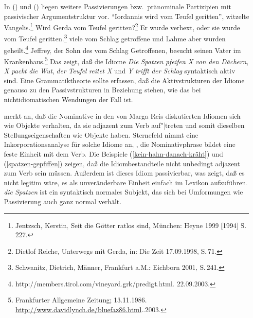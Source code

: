 \noindent
In () und () liegen weitere Passivierungen bzw.\ pränominale Partizipien mit passivischer
Argumentstruktur vor.
\eal
\label{vom-teufel-geritten}
\ex 
"`Iordannis wird vom Teufel geritten"', witzelte Vangelis.\footnote{
Jentzsch, Kerstin, Seit die Götter ratlos sind, München: Heyne 1999 [1994] S.\,227.
}
\ex Wird Gerda vom Teufel geritten?\footnote{
Dietlof Reiche, Unterwegs mit Gerda, in: Die Zeit 17.09.1998, S.\,71.
}
\ex
Er wurde verhext, oder sie wurde vom Teufel geritten.\footnote{
Schwanitz, Dietrich, Männer, Frankfurt a.M.: Eichborn 2001, S.\,241.
}
\zl
\eal
\ex viele vom Schlag getroffene und Lahme aber wurden geheilt.\footnote{
        http://members.tirol.com/vineyard.grk/predigt.html. 22.09.2003.
}
\ex Jeffrey, der Sohn des vom Schlag Getroffenen, besucht seinen Vater im Krankenhaus.\footnote{
         Frankfurter Allgemeine Zeitung; 13.11.1986. \url{http://www.davidlynch.de/bluefaz86.html}..2003.%
}
\zl
Das zeigt, daß die Idiome \emph{Die Spatzen pfeifen X von den Dächern}, \emph{X packt die Wut},
\emph{der Teufel reitet X} und \emph{Y trifft der Schlag} syntaktisch aktiv sind. Eine Grammatiktheorie
sollte erfassen, daß die Aktivstrukturen der Idiome genauso zu den Passivstrukturen in Beziehung stehen,
wie das bei nichtidiomatischen Wendungen der Fall ist.

\citet[]{Sternefeld85a} merkt an, daß die Nominative in den von Marga Reis
diskutierten Idiomen sich wie Objekte verhalten, da sie adjazent
zum Verb auf"|treten und somit dieselben Stellungseigenschaften wie Objekte haben.
Sternefeld nimmt eine Inkorporationsanalyse für solche Idiome an,
\dash, die Nominativphrase bildet eine feste Einheit mit dem Verb.
Die Beispiele (\ref{kein-hahn-danach-kräht}) und (\ref{spatzen-gepfiffen}) zeigen, daß die Idiombestandteile nicht unbedingt
adjazent zum Verb sein müssen. Außerdem ist dieses Idiom passivierbar, was zeigt, daß
es nicht legitim wäre, es als unveränderbare Einheit einfach im Lexikon aufzuführen.
\emph{die Spatzen} ist ein syntaktisch normales Subjekt, das sich bei Umformungen
wie Passivierung auch ganz normal verhält.


